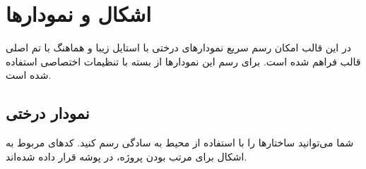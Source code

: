 \chapter{اشکال و نمودارها}
\label{chap:figures}

در این قالب امکان رسم سریع نمودارهای درختی با استایل زیبا و هماهنگ با تم اصلی قالب فراهم شده است. برای رسم این نمودارها از بسته  با تنظیمات اختصاصی استفاده شده است.

\section{نمودار درختی}
شما می‌توانید ساختارها را با استفاده از محیط  به سادگی رسم کنید. کدهای مربوط به اشکال برای مرتب بودن پروژه، در پوشه  قرار داده شده‌اند.


